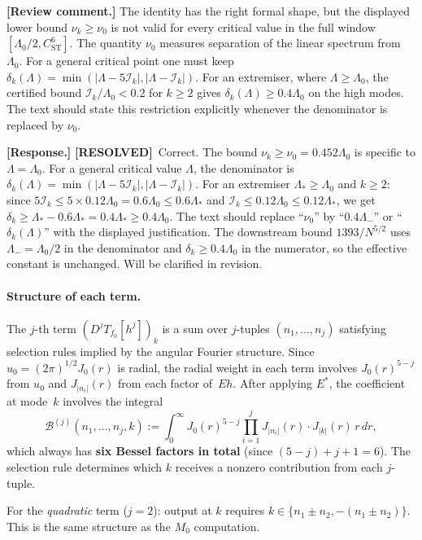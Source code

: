 \documentclass[12pt]{article}
\theoremstyle{definition}
\theoremstyle{remark}
\newcommand{\review}[1]{\par\smallskip\noindent\textbf{\color{red}[Review comment.]} {\color{red}#1}\par\smallskip}
\newcommand{\response}[1]{\par\noindent\textbf{\color{blue}[Response.]} {\color{blue}#1}\par\smallskip}
\newcommand{\resolved}{\textbf{\color{teal}[RESOLVED]}}
\begin{document}
\review{The identity has the right formal shape, but the displayed lower
bound $\nu_k\geq\nu_0$ is not valid for every critical value in the full
window $[\Lambda_0/2,C_{\mathrm{ST}}^6]$.  The quantity $\nu_0$ measures
separation of the linear spectrum from \emph{$\Lambda_0$}.  For a general
critical point one must keep
$\delta_k(\Lambda)=\min(|\Lambda-5\mathcal I_k|,|\Lambda-\mathcal I_k|)$.
For an extremiser, where $\Lambda\geq\Lambda_0$, the certified bound
$\mathcal I_k/\Lambda_0<0.2$ for $k\geq2$ gives
$\delta_k(\Lambda)\geq0.4\Lambda_0$ on the high modes.  The text should
state this restriction explicitly whenever the denominator is replaced by
$\nu_0$.}

\response{\resolved\ Correct.  The bound
$\nu_k\geq\nu_0=0.452\Lambda_0$ is specific to
$\Lambda=\Lambda_0$.  For a general critical value $\Lambda$, the
denominator is $\delta_k(\Lambda)=\min(|\Lambda-5\mathcal I_k|,
|\Lambda-\mathcal I_k|)$.  For an extremiser $\Lambda_*\geq\Lambda_0$
and $k\geq 2$: since $5\mathcal I_k\leq 5\times 0.12\Lambda_0
=0.6\Lambda_0\leq 0.6\Lambda_*$ and $\mathcal I_k\leq 0.12\Lambda_0
\leq 0.12\Lambda_*$, we get $\delta_k\geq
\Lambda_*-0.6\Lambda_*=0.4\Lambda_*\geq 0.4\Lambda_0$.  The text
should replace ``$\nu_0$'' by ``$0.4\Lambda_-$'' or
``$\delta_k(\Lambda)$'' with the displayed justification.  The
downstream bound $1393/N^{5/2}$ uses $\Lambda_-=\Lambda_0/2$ in
the denominator and $\delta_k\geq 0.4\Lambda_0$ in the numerator,
so the effective constant is unchanged.  Will be clarified in
revision.}

\paragraph{Structure of each term.}
The $j$-th term $(D^jT_{f_0}[h^j])_k$ is a sum over $j$-tuples
$(n_1,\ldots,n_j)$ satisfying selection rules implied by the angular
Fourier structure.  Since $u_0=(2\pi)^{1/2}J_0(r)$ is radial, the
radial weight in each term involves $J_0(r)^{5-j}$ from $u_0$ and
$J_{|n_i|}(r)$ from each factor of~$Eh$.  After applying $E^*$, the
coefficient at mode~$k$ involves the integral
\[
  \mathcal B^{(j)}(n_1,\ldots,n_j,k)
  :=
  \int_0^\infty J_0(r)^{5-j}\prod_{i=1}^j J_{|n_i|}(r)
  \cdot J_{|k|}(r)\,r\,dr,
\]
which always has \textbf{six Bessel factors in total} (since
$(5-j)+j+1=6$).  The selection rule determines which $k$ receives a
nonzero contribution from each $j$-tuple.

For the \emph{quadratic} term ($j=2$): output at $k$ requires
$k\in\{n_1\pm n_2,-(n_1\pm n_2)\}$.  This is the same structure as
the $M_0$ computation.
\end{document}

